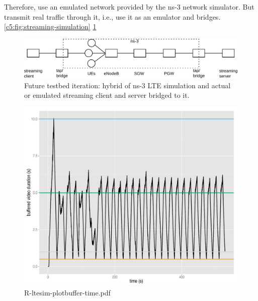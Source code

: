 Therefore, use an emulated network provided by the ns-3 network simulator. But transmit real traffic through it, i.e., use it as an emulator and bridges. \ref{c5:fig:streaming-simulation} \ref{c5:fig:streaming-hybrid}


\begin{figure}[htb]
\centering
\includegraphics[width=\textwidth]{images/streaming-hybrid.pdf}
\caption{Future testbed iteration: hybrid of ns-3 LTE simulation and actual or emulated streaming client and server bridged to it.}
\label{c5:fig:streaming-hybrid}
\end{figure}



\begin{figure}[htb]
\centering
\includegraphics[width=1.0\textwidth]{images/R-ltesim-plotbuffer-time.pdf}
\caption{R-ltesim-plotbuffer-time.pdf}
\label{c5:fig:ltesim-plotbuffer-time}
\end{figure}


